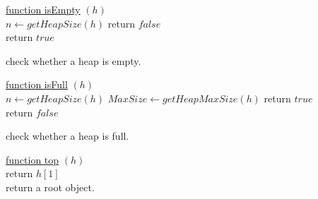 \documentclass{article}
\begin{document}
\begin{algorithm}
    

    \underline{function isEmpty} $(h)$\\
    $n \leftarrow getHeapSize(h)$ 
      {
        return $false$\\
      }
      {
        return $true$\\
      }
    
    \caption{check whether a heap is empty.}
\end{algorithm}


\begin{algorithm}
    

    \underline{function isFull} $(h)$\\
    $n \leftarrow getHeapSize(h)$ 
    $MaxSize \leftarrow getHeapMaxSize(h)$ 
      {
        return $true$\\
      }
      {
        return $false$\\
      }
    
    \caption{check whether a heap is full.}
\end{algorithm}






\begin{algorithm}
    

    \underline{function top} $(h)$\\
        return $h[1]$\\
    \caption{return a root object.}
\end{algorithm}
\end{document}
